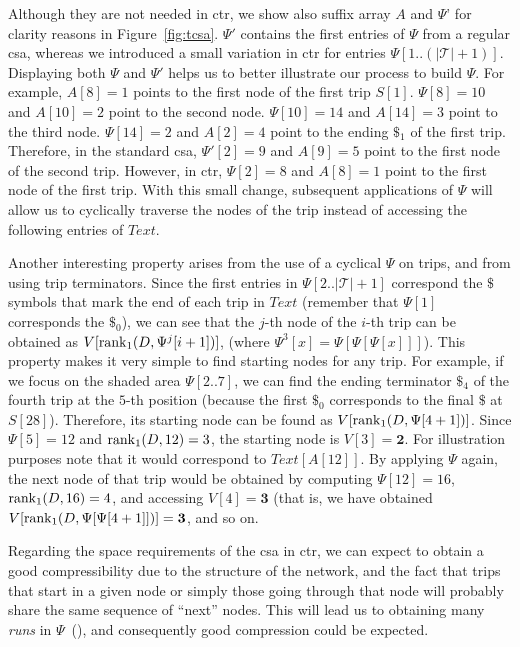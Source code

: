 	Although they are not needed in \gls{ctr}, we show also suffix array $A$ and $\Psi$' for clarity reasons in Figure~\ref{fig:tcsa}. 
	$\Psi'$  contains the first entries of $\Psi$ from a regular \gls{csa}, whereas we introduced a small variation
	in \gls{ctr} for entries $\Psi[1..(|\mathcal{T}|+1)]$. Displaying both $\Psi$ and $\Psi'$ helps us to better illustrate our process to build $\Psi$. 
	For example, $A[8]=1$ points to the first node of the first trip $S[1]$.
	$\Psi[8]=10$ and $A[10]=2$ point to the second node.  $\Psi[10]=14$ and $A[14]=3$ point to the third node.
	$\Psi[14]=2$ and $A[2]=4$ point to the ending $\$_1$ of the first trip. Therefore, in the standard 
	\gls{csa}, $\Psi'[2]=9$ and $A[9]=5$  point to the first node of the second trip. 
	However, in  \gls{ctr}, $\Psi[2]=8$ and $A[8]=1$ point
	to the first node of the first trip. With this small change, subsequent applications of $\Psi$ will allow 
	us to cyclically traverse the nodes of the trip instead of accessing the following entries of $Text$.

	Another interesting property arises from the use of a cyclical $\Psi$ on trips, and from using trip terminators.
	Since the first entries in $\Psi[2..|\mathcal{T}|+1]$ correspond the $\$$ symbols that 
	mark the end of each trip in $Text$ (remember that $\Psi[1]$ corresponds the $\$_0$), we can see that the $j$-th node of the $i$-th trip can
	be obtained as $V[\operatorname{rank}_1(D, \Psi^j[i+1])]$, (where $\Psi^3[x]= \Psi[\Psi[\Psi[x]]]$). This property
	makes it very simple to find starting nodes for any trip.
	For example, if we focus on the shaded area $\Psi[2..7]$, we can find the ending terminator $\$_4$ of the
	fourth trip at the $5$-th position (because the first $\$_0$
	corresponds to the final $\$$ at $S[28]$). Therefore, its starting node can be found 
	as $V[\operatorname{rank}_1(D, \Psi[4+1])]$. Since $\Psi[5] = 12$ and $\operatorname{rank}_1(D,12)= 3$, 
	the starting node is $V[3]=\mathbf{2}$. For illustration purposes note that it would correspond to $Text[A[12]]$.
	By applying $\Psi$ again, the next node of that trip would be obtained by computing $\Psi[12] = 16$, 
	$\operatorname{rank}_1(D,16)=4$, and accessing $V[4]=\mathbf{3}$  (that is, we have obtained 
	 $V[\operatorname{rank}_1(D, \Psi[\Psi[4+1]])]=\mathbf{3}$, and so on. 

	Regarding the space requirements of the \gls{csa} in \gls{ctr}, we can expect to obtain a good compressibility
	due to the structure of the network, and the fact that trips that start in a given node or simply
	those going through that node will probably share the same sequence of ``next'' nodes. This will
	lead us to obtaining many {\em runs} in $\Psi$~(\cite{NM07}), and consequently good compression could be expected.

